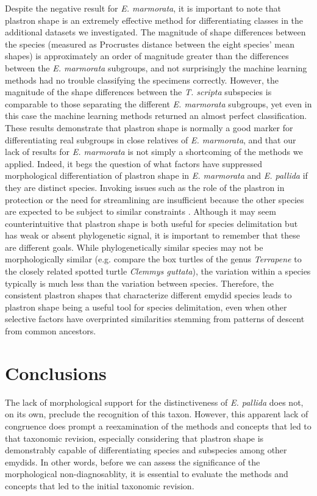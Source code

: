 \documentclass[fleqn,10pt,lineno]{wlpeerj} %
\begin{document}
Despite the negative result for \textit{E. marmorata}, it is important to note that plastron shape is an extremely effective method for differentiating classes in the additional datasets we investigated. The magnitude of shape differences between the species (measured as Procrustes distance between the eight species' mean shapes) is approximately an order of magnitude greater than the differences between the \textit{E. marmorata} subgroups, and not surprisingly the machine learning methods had no trouble classifying the specimens correctly. However, the magnitude of the shape differences between the \textit{T. scripta} subspecies is comparable to those separating the different \textit{E. marmorata} subgroups, yet even in this case the machine learning methods returned an almost perfect classification. These results demonstrate that plastron shape is normally a good marker for differentiating real subgroups in close relatives of \textit{E. marmorata}, and that our lack of results for \textit{E. marmorata} is not simply a shortcoming of the methods we applied. Indeed, it begs the question of what factors have suppressed morphological differentiation of plastron shape in \textit{E. marmorata} and \textit{E. pallida} if they are distinct species. Invoking issues such as the role of the plastron in protection or the need for streamlining are insufficient because the other species are expected to be subject to similar constraints \citep{Stayton2011,Polly2016}. Although it may seem counterintuitive that plastron shape is both useful for species delimitation but has weak or absent phylogenetic signal, it is important to remember that these are different goals. While phylogenetically similar species may not be morphologically similar (e.g. compare the box turtles of the genus \textit{Terrapene} to the closely related spotted turtle \textit{Clemmys guttata}), the variation within a species typically is much less than the variation between species. Therefore, the consistent plastron shapes that characterize different emydid species leads to plastron shape being a useful tool for species delimitation, even when other selective factors have overprinted similarities stemming from patterns of descent from common ancestors.

\section*{Conclusions}

The lack of morphological support for the distinctiveness of \textit{E. pallida} does not, on its own, preclude the recognition of this taxon. However, this apparent lack of congruence does prompt a reexamination of the methods and concepts that led to that taxonomic revision, especially considering that plastron shape is demonstrably capable of differentiating species and subspecies among other emydids. In other words, before we can assess the significance of the morphological non-diagnosablity, it is essential to evaluate the methods and concepts that led to the initial taxonomic revision. 
\end{document}
